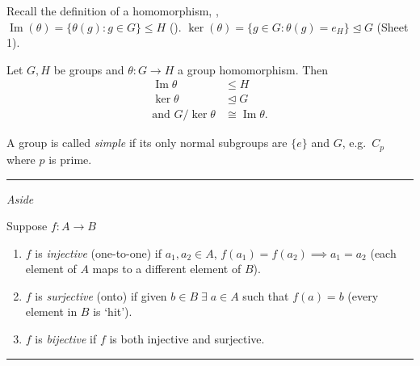 \medskip

Recall the definition of a homomorphism, , \\
\(\operatorname{Im}(\theta) = \{ \theta (g) : g \in G \} \leq H\) ().
\(\ker(\theta) = \{ g \in G : \theta (g) = e_H \} \trianglelefteq G\) (Sheet 1).

\begin{theorem}
\protect\hypertarget{thm:six}{}\label{thm:six}
Let \(G, H\) be groups and \(\theta : G \to H\) a group homomorphism.
Then \begin{align*}
    \operatorname{Im} \theta &\leq H \\
    \ker \theta &\trianglelefteq G \\
    \text{and } G / \ker \theta &\cong \operatorname{Im} \theta.
\end{align*}
\end{theorem}

\begin{definition}
\protect\hypertarget{def:sixteen}{}\label{def:sixteen}
A group is called \emph{simple} if its only normal subgroups are \(\{ e \}\) and \(G\),
e.g.~\(C_p\) where \(p\) is prime.
\end{definition}

\begin{center}\rule{\linewidth}{0.5pt}\end{center}

\emph{Aside}

\begin{definition}
  Suppose \(f : A \to B\)

  \begin{enumerate}
  \def\labelenumi{\roman{enumi}.}
  \item
    \(f\) is \emph{injective} (one-to-one) if \(a_1, a_2 \in A\), \(f(a_1) = f(a_2) \implies a_1 = a_2\) (each element of \(A\) maps to a different element of \(B\)).
  \item
    \(f\) is \emph{surjective} (onto) if given \(b \in B \; \exists \; a \in A\) such that \(f(a) = b\) (every element in \(B\) is `hit').
  \item
    \(f\) is \emph{bijective} if \(f\) is both injective and surjective.
  \end{enumerate}
\end{definition}

\begin{center}\rule{\linewidth}{0.5pt}\end{center}

